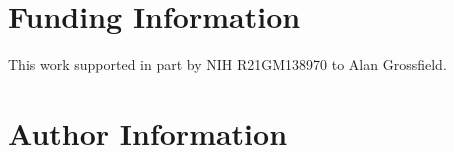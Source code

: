 \documentclass[9pt,training]{livecoms}
\begin{document}
\section{Funding Information}
This work supported in part by NIH R21GM138970 to Alan Grossfield.

\section*{Author Information}
\makeorcid




\end{document}
